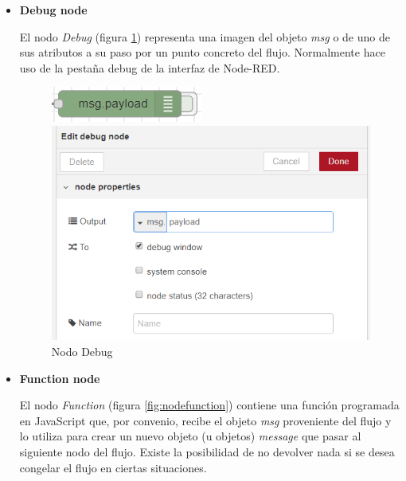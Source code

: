 \begin{itemize}
\item \textbf{Debug node}

El nodo \textit{Debug} (figura \ref{fig:nodedebug}) representa una imagen del objeto \textit{msg} o de uno de sus atributos a su paso por un punto concreto del flujo. Normalmente hace uso de la pestaña debug de la interfaz de Node-RED.

\begin{figure}[H]
  \centering
  \begin{minipage}[b]{0.3\textwidth}
    \includegraphics[width=\textwidth]{figuras/debugNode.png}
  \end{minipage}
  \hfill
  \begin{minipage}[b]{0.5\textwidth}
    \includegraphics[width=\textwidth]{figuras/debugNodeProp.png}
  \end{minipage}
  \caption{Nodo Debug}\label{fig:nodedebug}
\end{figure}

\item \textbf{Function node}

El nodo \textit{Function} (figura \ref{fig:nodefunction}) contiene una función programada en JavaScript que, por convenio, recibe el objeto \textit{msg} proveniente del flujo y lo utiliza para crear un nuevo objeto (u objetos) \textit{message} que pasar al siguiente nodo del flujo. Existe la posibilidad de no devolver nada si se desea congelar el flujo en ciertas situaciones.


\end{itemize}
